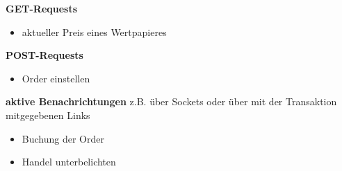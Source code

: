 	\textbf{GET-Requests}
		\begin{itemize}
			\item aktueller Preis eines Wertpapieres
		\end{itemize}
	\textbf{POST-Requests}
		\begin{itemize}
			\item Order einstellen
		\end{itemize}
	\textbf{aktive Benachrichtungen} z.B. über Sockets oder über mit der Transaktion mitgegebenen Links
		\begin{itemize}
			\item Buchung der Order
			\item Handel unterbelichten
		\end{itemize}